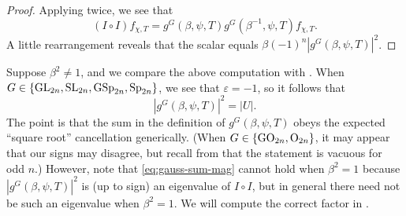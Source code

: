 \begin{proof}
	Applying  twice, we see that
	\[(I\circ I)f_{\chi,T}=g^G(\beta,\psi,T)g^G\left(\beta^{-1},\psi,T\right)f_{\chi,T}.\]
    A little rearrangement reveals that the scalar equals $\beta(-1)^n\left|g^G(\beta,\psi,T)\right|^2$.
\end{proof}
\begin{remark}
	Suppose $\beta^2\ne1$, and we compare the above computation with . When $G\in\{\mathrm{GL}_{2n},\mathrm{SL}_{2n},\mathrm{GSp}_{2n},\mathrm{Sp}_{2n}\}$, we see that $\varepsilon=-1$, so it follows that
	\begin{equation}
		\left|g^G(\beta,\psi,T)\right|^2=\left|U\right|. \label{eq:gauss-sum-mag}
	\end{equation}
	The point is that the sum in the definition of $g^G(\beta,\psi,T)$ obeys the expected ``square root'' cancellation generically. (When $G\in\{\mathrm{GO}_{2n},\mathrm{O}_{2n}\}$, it may appear that our signs may disagree, but recall from  that the statement is vacuous for odd $n$.)
    However, note that \eqref{eq:gauss-sum-mag} cannot hold when $\beta^2=1$ because $\left|g^G(\beta,\psi,T)\right|^2$ is (up to sign) an eigenvalue of $I\circ I$, but in general there need not be such an eigenvalue when $\beta^2=1$. We will compute the correct factor in .
\end{remark}
